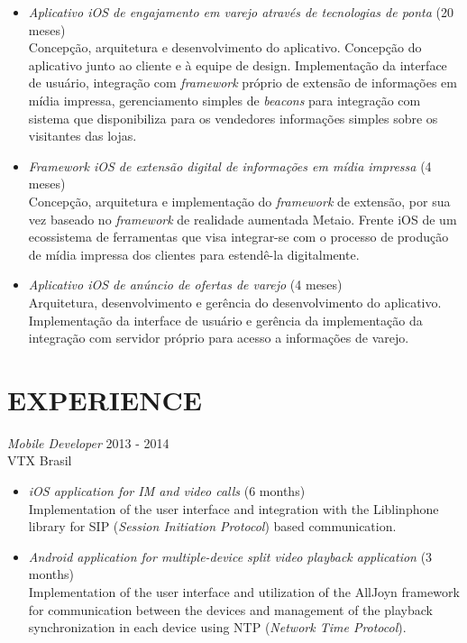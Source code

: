 \documentclass[]{res} %
\newcommand{\sbt}{\,\begin{picture}(-1,1)(-2,-3)\circle*{2}\end{picture}\ }
\def \divspace{6pt}
\def \myitemback{0.55cm}
\def \myitemsep{0pt}
\def \mypositionface{\sl}
\def \myorgface{\sc}
\newif\ifgames
\begin{document}
\begin{resume}
\begin{itemize}[itemsep=\myitemsep,leftmargin=\myitemback]
    \ifgames
        \vfill
    \else
    \fi

    \item[\sbt] {\it Aplicativo iOS de engajamento em varejo através de tecnologias de ponta} \hfill (20 meses)\\
    Concepção, arquitetura e desenvolvimento do aplicativo. Concepção do aplicativo junto ao cliente e à equipe de design. Implementação da interface de usuário, integração com {\it framework} próprio de extensão de informações em mídia impressa, gerenciamento simples de {\it beacons} para integração com sistema que disponibiliza para os vendedores informações simples sobre os visitantes das lojas.
    \item[\sbt] {\it Framework iOS de extensão digital de informações em mídia impressa} \hfill (4 meses)\\
    Concepção, arquitetura e implementação do {\it framework} de extensão, por sua vez baseado no {\it framework} de realidade aumentada Metaio. Frente iOS de um ecossistema de ferramentas que visa integrar-se com o processo de produção de mídia impressa dos clientes para estendê-la digitalmente.

    \ifgames
    \else
        \vfill
    \fi

    \item[\sbt] {\it Aplicativo iOS de anúncio de ofertas de varejo} \hfill (4 meses)\\
    Arquitetura, desenvolvimento e gerência do desenvolvimento do aplicativo. Implementação da interface de usuário e gerência da implementação da integração com servidor próprio para acesso a informações de varejo.
\end{itemize}
\else
    \section{EXPERIENCE \hspace{\divspace} }

    {\mypositionface Mobile Developer} \hfill 2013 - 2014 \\
    {\myorgface VTX Brasil}

    \begin{itemize}[itemsep=\myitemsep,leftmargin=\myitemback]
    \item[\sbt] {\it iOS application for IM and video calls} \hfill (6 months)\\
    Implementation of the user interface and integration with the Liblinphone library for SIP ({\it Session Initiation Protocol}) based communication.
    \item[\sbt] {\it Android application for multiple-device split video playback application} \hfill (3 months)\\
    Implementation of the user interface and utilization of the AllJoyn framework for communication between the devices and management of the playback synchronization in each device using NTP ({\it Network Time Protocol}).
    \end{itemize}


\end{resume}
\end{document}
